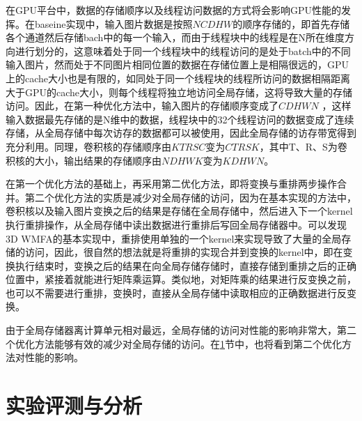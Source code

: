 在GPU平台中，数据的存储顺序以及线程访问数据的方式将会影响GPU性能的发挥。在baseine实现中，输入图片数据是按照$NCDHW$的顺序存储的，即首先存储各个通道然后存储bach中的每一个输入，而由于线程块中的线程是在N所在维度方向进行划分的，这意味着处于同一个线程块中的线程访问的是处于batch中的不同输入图片，然而处于不同图片相同位置的数据在存储位置上是相隔很远的，GPU上的cache大小也是有限的，如同处于同一个线程块的线程所访问的数据相隔距离大于GPU的cache大小，则每个线程将独立地访问全局存储，这将导致大量的存储访问。因此，在第一种优化方法中，输入图片的存储顺序变成了$CDHWN$ ，这样输入数据最先存储的是N维中的数据，线程块中的32个线程访问的数据变成了连续存储，从全局存储中每次访存的数据都可以被使用，因此全局存储的访存带宽得到充分利用。同理，卷积核的存储顺序由$KTRSC$变为$CTRSK$，其中T、R、S为卷积核的大小，输出结果的存储顺序由$NDHWK$变为$KDHWN$。

在第一个优化方法的基础上，再采用第二优化方法，即将变换与重排两步操作合并。第二个优化方法的实质是减少对全局存储的访问，因为在基本实现的方法中，卷积核以及输入图片变换之后的结果是存储在全局存储中，然后进入下一个kernel执行重排操作，从全局存储中读出数据进行重排后写回全局存储器中。可以发现3D WMFA的基本实现中，重排使用单独的一个kernel来实现导致了大量的全局存储的访问，因此，很自然的想法就是将重排的实现合并到变换的kernel中，即在变换执行结束时，变换之后的结果在向全局存储存储时，直接存储到重排之后的正确位置中，紧接着就能进行矩阵乘运算。类似地，对矩阵乘的结果进行反变换之前，也可以不需要进行重排，变换时，直接从全局存储中读取相应的正确数据进行反变换。

由于全局存储器离计算单元相对最远，全局存储的访问对性能的影响非常大，第二个优化方法能够有效的减少对全局存储的访问。在\ref{experiment}节中，也将看到第二个优化方法对性能的影响。


\section{实验评测与分析}
\label{experiment}
